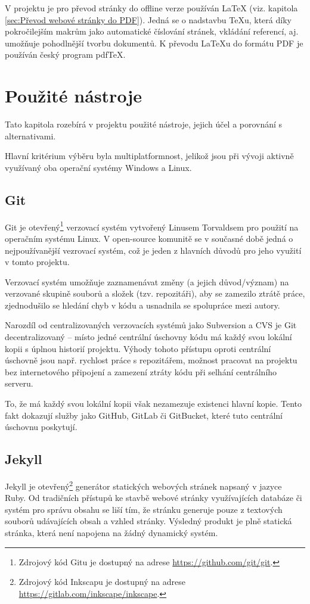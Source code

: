 \documentclass[a4paper, 12pt]{article}
\begin{document}
  V projektu je pro převod stránky do offline verze používán \LaTeX{} (viz. kapitola \ref{sec:Převod webové stránky do PDF}). Jedná se o nadstavbu \TeX u, která díky pokročilejším makrům jako automatické číslování stránek, vkládání referencí, aj. umožňuje pohodlnější tvorbu dokumentů\cite{getting-started-with-latex}. K převodu \LaTeX u do formátu PDF je používán český program pdf\TeX{}\cite{pdftex}.


  \section{Použité nástroje} \label{sec:Použité nástroje}
  Tato kapitola rozebírá v projektu použité nástroje, jejich účel a porovnání s alternativami.

  Hlavní kritérium výběru byla multiplatformnost, jelikož jsou při vývoji aktivně využívaný oba operační systémy Windows a Linux.


  \subsection{Git} \label{sec:Git}
  Git je otevřený\footnote{Zdrojový kód Gitu je dostupný na adrese \url{https://github.com/git/git}.} verzovací systém vytvořený Linusem Torvaldsem pro použití na operačním systému Linux. V open-source komunitě se v současné době jedná o nejpoužívanější vezrovací systém\cite{version-control-usage-statistics}, což je jeden z hlavních důvodů pro jeho využití v tomto projektu.

  Verzovací systém umožňuje zaznamenávat změny (a jejich důvod/význam) na verzované skupině souborů a složek (tzv. repozitáři), aby se zamezilo ztrátě práce, zjednodušilo se hledání chyb v kódu a usnadnila se spolupráce mezi autory.

  Narozdíl od centralizovaných verzovacích systémů jako Subversion a CVS je Git decentralizovaný -- místo jedné centrální úschovny kódu má každý svou lokální kopii s úplnou historií projektu. Výhody tohoto přístupu oproti centrální úschovně jsou např. rychlost práce s repozitářem, možnost pracovat na projektu bez internetového připojení a zamezení ztráty kódu při selhání centrálního serveru\cite{cvcs-vs-dvcs}.

  To, že má každý svou lokální kopii však nezamezuje existenci hlavní kopie. Tento fakt dokazují služby jako GitHub, GitLab či GitBucket, které tuto centrální úschovnu poskytují.


  \subsection{Jekyll} \label{sec:Jekyll}
  Jekyll je otevřený\footnote{Zdrojový kód Inkscapu je dostupný na adrese \url{https://gitlab.com/inkscape/inkscape}.} generátor statických webových stránek napsaný v jazyce Ruby. Od tradičních přístupů ke stavbě webové stránky využívajících databáze či systém pro správu obsahu se liší tím, že stránku generuje pouze z textových souborů udávajících obsah a vzhled stránky. Výsledný produkt je plně statická stránka, která není napojena na žádný dynamický systém.
\end{document}
